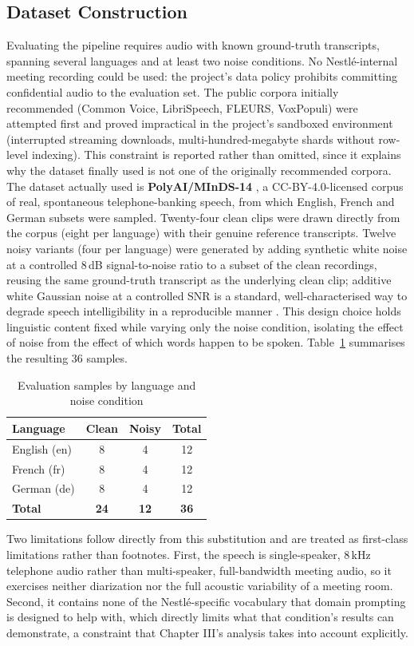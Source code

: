 \documentclass[12pt]{report}
\begin{document}
\subsection{Dataset Construction}
Evaluating the pipeline requires audio with known ground-truth transcripts, spanning several languages and at least two noise conditions. No Nestl\'e-internal meeting recording could be used: the project's data policy prohibits committing confidential audio to the evaluation set. The public corpora initially recommended (Common Voice, LibriSpeech, FLEURS, VoxPopuli) were attempted first and proved impractical in the project's sandboxed environment (interrupted streaming downloads, multi-hundred-megabyte shards without row-level indexing). This constraint is reported rather than omitted, since it explains why the dataset finally used is not one of the originally recommended corpora.
The dataset actually used is \textbf{PolyAI/MInDS-14} \cite{gerz2021multilingual}, a CC-BY-4.0-licensed corpus of real, spontaneous telephone-banking speech, from which English, French and German subsets were sampled. Twenty-four clean clips were drawn directly from the corpus (eight per language) with their genuine reference transcripts. Twelve noisy variants (four per language) were generated by adding synthetic white noise at a controlled 8\,dB signal-to-noise ratio to a subset of the clean recordings, reusing the same ground-truth transcript as the underlying clean clip; additive white Gaussian noise at a controlled SNR is a standard, well-characterised way to degrade speech intelligibility in a reproducible manner \cite{graetzer2021intelligibility}. This design choice holds linguistic content fixed while varying only the noise condition, isolating the effect of noise from the effect of which words happen to be spoken. Table~\ref{tab:dataset} summarises the resulting 36 samples.
\begin{table}[H]
\centering
\begin{tabular}{|l|c|c|c|}
\hline
\textbf{Language} & \textbf{Clean} & \textbf{Noisy} & \textbf{Total} \\ \hline
English (en) & 8 & 4 & 12 \\ \hline
French (fr) & 8 & 4 & 12 \\ \hline
German (de) & 8 & 4 & 12 \\ \hline
\textbf{Total} & \textbf{24} & \textbf{12} & \textbf{36} \\ \hline
\end{tabular}
\caption{Evaluation samples by language and noise condition}
\label{tab:dataset}
\end{table}
Two limitations follow directly from this substitution and are treated as first-class limitations rather than footnotes. First, the speech is single-speaker, 8\,kHz telephone audio rather than multi-speaker, full-bandwidth meeting audio, so it exercises neither diarization nor the full acoustic variability of a meeting room. Second, it contains none of the Nestl\'e-specific vocabulary that domain prompting is designed to help with, which directly limits what that condition's results can demonstrate, a constraint that Chapter III's analysis takes into account explicitly.
\end{document}
